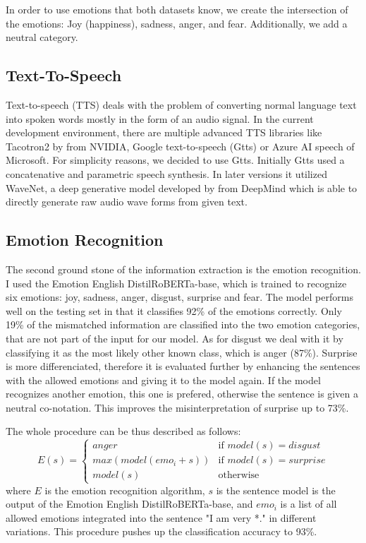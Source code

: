 \documentclass[11pt]{article}
\begin{document}
In order to use emotions that both datasets know, we create the intersection of the emotions: Joy (happiness), sadness, anger, and fear. Additionally, we add a neutral category.
\subsection{Text-To-Speech}
Text-to-speech (TTS) deals with the problem of converting normal language text into spoken words mostly in the form of an audio signal. 
In the current development environment, there are multiple advanced TTS libraries like Tacotron2 by \cite{shen_natural_2018} from NVIDIA, Google text-to-speech (Gtts) \cite{gtts} or Azure AI speech of Microsoft. For simplicity reasons, we decided to use Gtts. Initially Gtts used a concatenative and parametric speech synthesis. In later versions it utilized WaveNet, a deep generative model developed by \citeauthor{van2016wavenet} from DeepMind which is able to directly generate raw audio wave forms from given text.
\subsection{Emotion Recognition}

The second ground stone of the information extraction is the emotion recognition. I used the Emotion English DistilRoBERTa-base\cite{hartmann2022emotionenglish}, which is trained to recognize six emotions: joy, sadness, anger, disgust, surprise and fear. The model performs well on the testing set in that it classifies 92\% of the emotions correctly. Only 19\% of the mismatched information are classified into the two emotion categories, that are not part of the input for our model. As for disgust we deal with it by classifying it as the most likely other known class, which is anger (87\%). Surprise is more differenciated, therefore it is evaluated further by enhancing the sentences with the allowed emotions and giving it to the model again. If the model recognizes another emotion, this one is prefered, otherwise the sentence is given a neutral co-notation. This improves the misinterpretation of surprise up to 73\%.

The whole procedure can be thus described as follows:
{
\small
\begin{equation*}
E(s)=\begin{cases}
  anger & \text{if } model(s)=disgust\\      
  max(model(emo_i+s)) & \text{if }  model(s)=surprise\\
  model(s) & \text{otherwise } 
\end{cases}
\end{equation*}
}
where $E$ is the emotion recognition algorithm, $s$ is the sentence model is the output of the Emotion English DistilRoBERTa-base, and $emo_i$ is a list of all allowed emotions integrated into the sentence "I am very *." in different variations.
This procedure pushes up the classification accuracy to 93\%.
\end{document}
